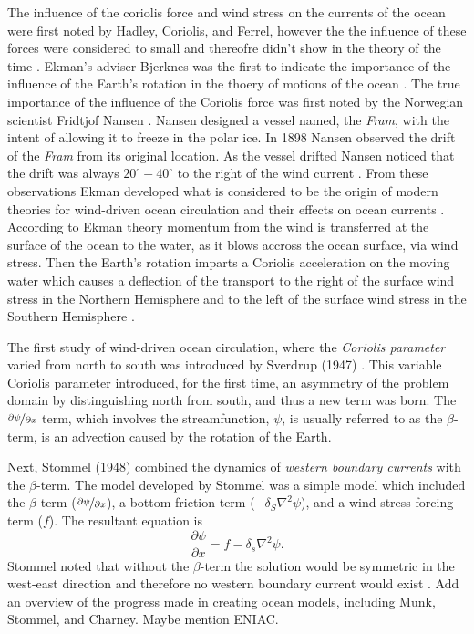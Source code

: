 The influence of the coriolis force and wind stress on the currents of the ocean
were first noted by Hadley, Coriolis, and Ferrel, however the the influence of
these forces were considered to small and thereofre didn't show in the theory of
the time \cite{Ekman1905}. Ekman's adviser Bjerknes was the first to indicate
the importance of the influence of the Earth's rotation in the thoery of motions
of the ocean \cite{Ekman1905}. The true importance of the influence of the
Coriolis force was first noted by the Norwegian scientist Fridtjof Nansen
\cite{Beesley2008, Ekman1905}. Nansen designed a vessel named, the \emph{Fram},
with the intent of allowing it to freeze in the polar ice. In 1898 Nansen
observed the drift of the \emph{Fram} from its original location. As the vessel
drifted Nansen noticed that the drift was always $20^\circ - 40^\circ$ to the
right of the wind current \cite{Beesley2008}. From these observations Ekman
\cite{Elman} developed what is considered to be the origin of modern theories
for wind-driven ocean circulation and their effects on ocean currents
\cite{Price1987}. According to Ekman theory momentum from the wind is
transferred at the surface of the ocean to the water, as it blows accross the
ocean surface, via wind stress. Then the Earth's rotation imparts a Coriolis
acceleration on the moving water which causes a deflection of the transport to
the right of the surface wind stress in the Northern Hemisphere and to the left
of the surface wind stress in the Southern Hemisphere \cite{Beesley2008}.

The first study of wind-driven ocean circulation, where the \emph{Coriolis
parameter} varied from north to south was introduced by Sverdrup (1947)
\cite{Fox-Kemper2003}. This variable Coriolis parameter introduced, for the
first time, an asymmetry of the problem domain by distinguishing north from
south, and thus a new term was born.  The $\nicefrac{\partial \psi}{\partial x}$
term, which involves the streamfunction, $\psi$, is usually referred to as the
$\beta$-term, is an advection caused by the rotation of the Earth.

Next, Stommel (1948) combined the dynamics of \emph{western boundary currents}
with the $\beta$-term. The model developed by Stommel was a simple model which
included the $\beta$-term ($\nicefrac{\partial \psi}{\partial x}$), a bottom
friction term ($-\delta_S \nabla^2 \psi$), and a wind stress forcing term ($f$).
The resultant equation is
\begin{equation}
  \frac{\partial \psi}{\partial x} = f - \delta_s \nabla^2 \psi.
  \label{eqn:StommelModel}
\end{equation}
Stommel noted that without the $\beta$-term the solution would be symmetric in
the west-east direction and therefore no western boundary current would exist
\cite{Stommel1948}.
{\color{red} Add an overview of the progress made in creating ocean models,
including Munk, Stommel, and Charney. Maybe mention ENIAC.}


